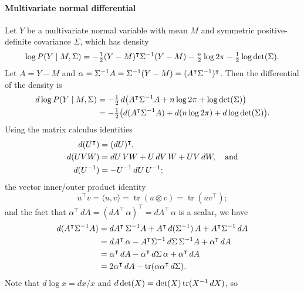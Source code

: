 \documentclass{article}
\newcommand{\Mu}{M}
\newcommand{\T}{\intercal}
\newcommand{\given}{\mathrel{|}}
\newcommand{\smallfrac}[2]{{\textstyle\frac{#1}{#2}}}
\newcommand{\n}[1]{\text{\rm #1}}
\newcommand{\one}{\n1}
\newcommand{\two}{\n2}
\DeclareMathOperator{\tr}{tr}
\begin{document}
\paragraph{Multivariate normal differential}
Let $Y$ be a multivariate normal variable with mean $\Mu$ and
 symmetric positive-definite covariance $\Sigma$, which has density
%
\begin{equation}
  \log P(Y \given \Mu, \Sigma)
    = -\smallfrac{\one}{\two}
        (Y - \Mu)^\T \Sigma^{-\one} (Y - \Mu)
      - \smallfrac{n}{\two} \log \two\pi
      - \smallfrac{\one}{\two} \log \det(\Sigma).
\end{equation}
%
Let $A = Y - \Mu$ and $\alpha = \Sigma^{-\one} A = \Sigma^{-\one} (Y -
 \Mu) = (A^\T \Sigma^{-\one})^\T$.
Then the differential of the density is
%
\begin{align}
  d \log P(Y \given \Mu, \Sigma)
   &= -\smallfrac{\one}{\two} \, d \bigl(
        A^\T \Sigma^{-\one} A
        + n \log \two\pi
        + \log \det(\Sigma)
      \bigr) \\
   &= -\smallfrac{\one}{\two} \bigl(
        d(A^\T \Sigma^{-\one} A)
        + d(n \log \two\pi)
        + d \log \det(\Sigma)
      \bigr).
\end{align}
%
Using the matrix calculus identities
%
\begin{align}
  d (U^\T) &= (dU)^\T, \\
  d (U V W) &= dU\,V W + U\,dV\,W + U V\,dW, \quad\text{and} \\
  d (U^{-\one}) &= -U^{-\one}\,dU\,U^{-\one};
\end{align}
%
 the vector inner/outer product identity
%
\begin{equation}
  u^\T v = \langle u, v \rangle = \tr(u \otimes v) = \tr(u v^\T);
\end{equation}
%
 and the fact that $\alpha^\T\,dA= (dA^\T\,\alpha)^\T = dA^\T\,\alpha$
 is a scalar, we have
%
\begin{align}
  d (A^\T \Sigma^{-\one} A)
   &= dA^\T\,\Sigma^{-\one} A
      + A^\T\,d(\Sigma^{-\one})\,A
      + A^\T \Sigma^{-\one}\,dA \\
   &= dA^\T\,\alpha
      - A^\T \Sigma^{-\one}\,d\Sigma\,\Sigma^{-\one} A
      + \alpha^\T\,dA \\
   &= \alpha^\T\,dA
      - \alpha^\T\,d\Sigma\,\alpha
      + \alpha^\T\,dA \\
   &= \two \alpha^\T\,dA
      - \tr(\alpha \alpha^\T \,d\Sigma).
\end{align}
%
Note that $d \log x = dx/x$ and $d \det(X) = \det(X) \tr(X^{-\one}\,dX)$, so
\end{document}
